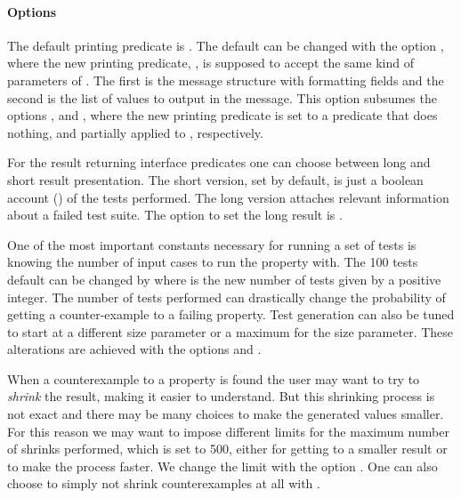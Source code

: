 \paragraph{\plqc{} Options}

The default printing predicate is .
%
The default can be changed with the option
, where the new printing predicate,
, is supposed to accept the same kind of parameters of
.
%
The first is the message structure with formatting fields and the second
is the list of values to output in the message.
%
This option subsumes the options ,  and
, where the new printing predicate is set to a
predicate that does nothing,  and  partially
applied to , respectively.


For the result returning interface predicates one can choose between
long and short result presentation.
%
The short version, set by default, is just a boolean account
() of the tests performed.
%
The long version attaches relevant information about a failed test
suite.
%
The option to set the long result is .


One of the most important constants necessary for running a set of tests
is knowing the number of input cases to run the property with.
%
The 100 tests default can be changed by  where
 is the new number of tests given by a positive integer.
%
The number of tests performed can drastically change the probability of
getting a counter-example to a failing property.
%
Test generation can also be tuned to start at a different size parameter
or a maximum for the size parameter.
%
These alterations are achieved with the options
 and .


When a counterexample to a property is found the user may want \plqc{}
to try to \emph{shrink} the result, making it easier to understand.
%
But this shrinking process is not exact and there may be many choices to
make the generated values smaller.
%
For this reason we may want to impose different limits for the maximum
number of shrinks performed, which is set to 500, either for getting to
a smaller result or to make the process faster.
%
We change the limit with the option .
%
One can also choose to simply not shrink counterexamples at all with
.

